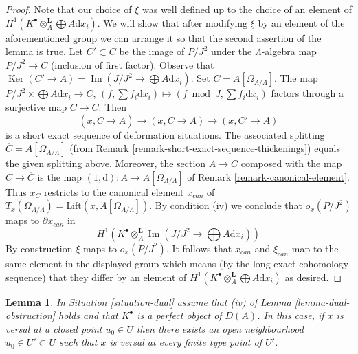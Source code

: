 \documentclass{stacks-project}
\theoremstyle{plain}
\newtheorem{lemma}[subsection]{Lemma}
\theoremstyle{definition}
\theoremstyle{remark}
\numberwithin{equation}{subsection}
\def\Ker{\mathop{\mathrm{Ker}}}
\def\Im{\mathop{\mathrm{Im}}}
\begin{document}
\begin{proof}
\medskip\noindent
Note that our choice of $\xi$ was well defined up to the choice of an
element of $H^1(K^\bullet \otimes_A^\mathbf{L} \bigoplus A\text{d}x_i)$.
We will show that after modifying $\xi$ by an element of the aforementioned
group we can arrange it so that the second assertion of the lemma is true.
Let $C' \subset C$ be the image of $P/J^2$ under the
$\Lambda$-algebra map $P/J^2 \to C$ (inclusion of first factor).
Observe that
$\Ker(C' \to A) = \Im(J/J^2 \to \bigoplus A\text{d}x_i)$.
Set $\overline{C} = A[\Omega_{A/\Lambda}]$. The map
$P/J^2 \times \bigoplus A \text{d}x_i \to \overline{C}$,
$(f, \sum f_i \text{d}x_i) \mapsto (f \bmod J, \sum f_i \text{d}x_i)$
factors through a surjective map $C \to \overline{C}$. Then
$$
(x, \overline{C} \to A) \to (x, C \to A) \to (x, C' \to A)
$$
is a short exact sequence of deformation situations. The
associated splitting $\overline{C} = A[\Omega_{A/\Lambda}]$ (from
Remark \ref{remark-short-exact-sequence-thickenings}) equals the given
splitting above. Moreover, the section $A \to C$ composed with the map
$C \to \overline{C}$
is the map $(1, \text{d}) : A \to A[\Omega_{A/\Lambda}]$ of
Remark \ref{remark-canonical-element}.
Thus $x_C$ restricts to the canonical element $x_{can}$ of
$T_x(\Omega_{A/\Lambda}) = \text{Lift}(x, A[\Omega_{A/\Lambda}])$.
By condition (iv) we conclude that $o_x(P/J^2)$ maps to $\partial x_{can}$
in
$$
H^1(K^\bullet \otimes_A^\mathbf{L} \Im(J/J^2 \to \bigoplus A\text{d}x_i))
$$
By construction $\xi$ maps to $o_x(P/J^2)$. It follows that
$x_{can}$ and $\xi_{can}$ map to the same element in the
displayed group which means (by the long exact cohomology sequence)
that they differ by an element of
$H^1(K^\bullet \otimes_A^\mathbf{L} \bigoplus A\text{d}x_i)$
as desired.
\end{proof}

\begin{lemma}
\label{lemma-dual-openness}
In Situation \ref{situation-dual} assume that (iv) of
Lemma \ref{lemma-dual-obstruction} holds and that $K^\bullet$ is a
perfect object of $D(A)$. In this case, if $x$ is versal at a closed
point $u_0 \in U$ then there exists an open neighbourhood
$u_0 \in U' \subset U$ such that $x$ is versal at every finite type
point of $U'$.
\end{lemma}
\end{document}
